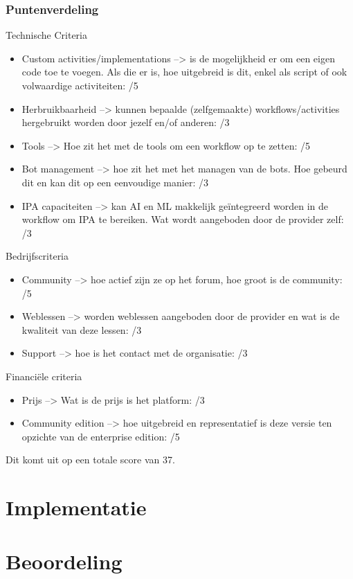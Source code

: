 \subsubsection{Puntenverdeling}
Technische Criteria
\begin{itemize}
	\item Custom activities/implementations --> is de mogelijkheid er om een eigen code toe te voegen. Als die er is, hoe uitgebreid is dit, enkel als script of ook volwaardige activiteiten: /5
	\item Herbruikbaarheid --> kunnen bepaalde (zelfgemaakte) workflows/activities hergebruikt worden door jezelf en/of anderen: /3
	\item Tools --> Hoe zit het met de tools om een workflow op te zetten: /5
	\item Bot management --> hoe zit het met het managen van de bots. Hoe gebeurd dit en kan dit op een eenvoudige manier: /3
	\item IPA capaciteiten --> kan AI en ML makkelijk geïntegreerd worden in de workflow om IPA te bereiken. Wat wordt aangeboden door de provider zelf: /3
\end{itemize}

Bedrijfscriteria
\begin{itemize}
	\item Community --> hoe actief zijn ze op het forum, hoe groot is de community: /5
	\item Weblessen --> worden weblessen aangeboden door de provider en wat is de kwaliteit van deze lessen: /3
	\item Support --> hoe is het contact met de organisatie: /3
\end{itemize}

Financiële criteria
\begin{itemize}
	\item Prijs --> Wat is de prijs is het platform: /3
	\item Community edition --> hoe uitgebreid en representatief is deze versie ten opzichte van de enterprise edition: /5
\end{itemize}

Dit komt uit op een totale score van 37.

\section{Implementatie}

\section{Beoordeling}
